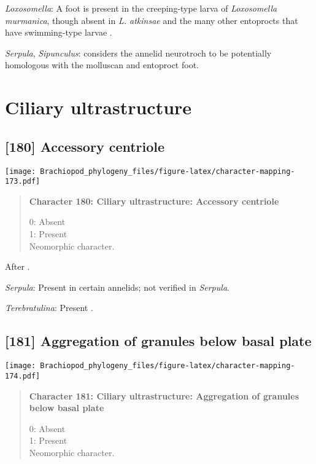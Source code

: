 \documentclass[openany]{book}
\theoremstyle{definition}
\theoremstyle{definition}
\theoremstyle{definition}
\theoremstyle{remark}
\begin{document}
\hypertarget{Loxosomella-coding-179}{}
\emph{Loxosomella}: A foot is present in the creeping-type larva of
\emph{Loxosomella} \emph{murmanica}, though absent in \emph{L. atkinsae}
and the many other entoprocts that have swimming-type larvae
\citep{Fuchs2008}.

\hypertarget{Serpula-coding-179}{}
\emph{Serpula}, \emph{Sipunculus}: \citet{Wingstrand1985} considers the
annelid neurotroch to be potentially homologous with the molluscan and
entoproct foot.

\section{Ciliary ultrastructure}\label{ciliary-ultrastructure}

\subsection*{{[}180{]} Accessory centriole}\label{accessory-centriole}

\texttt{[image: Brachiopod\_phylogeny\_files/figure-latex/character-mapping-173.pdf]}

\begin{quote}
\textbf{Character 180: Ciliary ultrastructure: Accessory centriole}

0: Absent\\
1: Present\\
Neomorphic character.
\end{quote}

After \citet{Lundin2009}.

\hypertarget{Serpula-coding-180}{}
\emph{Serpula}: Present in certain annelids; not verified in
\emph{Serpula}.

\hypertarget{Terebratulina-coding-180}{}
\emph{Terebratulina}: Present \citep{Luter1995}.

\subsection*{{[}181{]} Aggregation of granules below basal
plate}\label{aggregation-of-granules-below-basal-plate}

\texttt{[image: Brachiopod\_phylogeny\_files/figure-latex/character-mapping-174.pdf]}

\begin{quote}
\textbf{Character 181: Ciliary ultrastructure: Aggregation of granules
below basal plate}

0: Absent\\
1: Present\\
Neomorphic character.
\end{quote}
\end{document}
